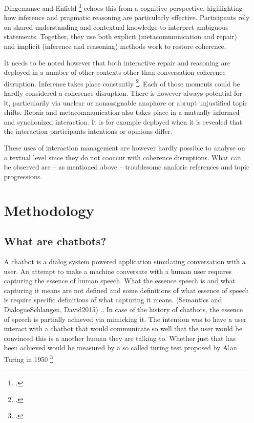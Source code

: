 \documentclass[12pt]{report}
\begin{document}
{\par
Dingemanse and Enfield \footcite{DINGEMANSE202430} echoes this from a cognitive perspective,
highlighting how inference and pragmatic reasoning are particularly effective.
Participants rely on shared understanding and contextual knowledge to interpret ambiguous statements.
Together, they use both
explicit (metacommunication and repair) and
implicit (inference and reasoning)
methods work to restore coherence.

\par
It needs to be noted however that both interactive repair and reasoning are
deployed in a number of other contexts
other than conversation coherence disruption.
Inference takes place constantly \footcite{garfinkelstudies}.
Each of those moments could be hardly considered a coherence disruption.
There is however always potential for it,
particularily via unclear or nonassignable anaphore or abrupt unjustified topic shifts.
Repair and metacommunication also takes place in a mutually informed and synchonized interaction.
It is for example deployed when it is revealed
that the interaction participants intentions or opinions differ.

\par
These uses of interaction management are however
hardly possible to analyse on a textual level
since they do not cooccur with coherence disruptions.
What can be observed are – as mentioned above –
troublesome anaforic references and topic progressions.

\chapter{Methodology}

\section{What are chatbots?}
\par
A chatbot is a dialog system powered application simulating conversation with a user.
An attempt to make a machine conversate with a human user requires capturing the essence of human speech.
What the essence speech is and what capturing it means are not defined and
some definitions of what essence of speech is
require specific definitions of what capturing it means.
(Semantics and DialogueSchlangen, David2015) ..
In case of the history of chatbots,
the essence of speech is partially achieved
via mimicking it.
The intention was to have a user interact with a chatbot
that would communicate so well that
the user would be convinced
this is a another human they are talking to.
Whether just that has been achieved would be measured by a so called turing test
proposed by Alan Turing in 1950 \footcite{turing1950computing}

}
\end{document}
